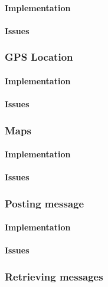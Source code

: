 \paragraph*{Implementation}

\paragraph*{Issues}


\subsubsection*{GPS Location}

\paragraph*{Implementation}

\paragraph*{Issues}


\subsubsection*{Maps}

\paragraph*{Implementation}

\paragraph*{Issues}


\subsubsection*{Posting message}

\paragraph*{Implementation}

\paragraph*{Issues}


\subsubsection*{Retrieving messages}


